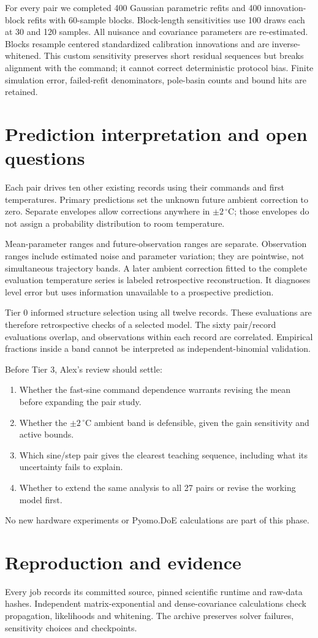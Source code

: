 \documentclass[10pt,letterpaper]{article}
\newcommand{\C}{\,^\circ\mathrm{C}}
\begin{document}
For every pair we completed 400 Gaussian parametric refits and 400 innovation-block refits with 60-sample blocks. Block-length sensitivities use 100 draws each at 30 and 120 samples. All nuisance and covariance parameters are re-estimated. Blocks resample centered standardized calibration innovations and are inverse-whitened. This custom sensitivity preserves short residual sequences but breaks alignment with the command; it cannot correct deterministic protocol bias. Finite simulation error, failed-refit denominators, pole-basin counts and bound hits are retained.

\section{Prediction interpretation and open questions}
Each pair drives ten other existing records using their commands and first temperatures. Primary predictions set the unknown future ambient correction to zero. Separate envelopes allow corrections anywhere in $\pm2\C$; those envelopes do not assign a probability distribution to room temperature.

Mean-parameter ranges and future-observation ranges are separate. Observation ranges include estimated noise and parameter variation; they are pointwise, not simultaneous trajectory bands. A later ambient correction fitted to the complete evaluation temperature series is labeled retrospective reconstruction. It diagnoses level error but uses information unavailable to a prospective prediction.

Tier 0 informed structure selection using all twelve records. These evaluations are therefore retrospective checks of a selected model. The sixty pair/record evaluations overlap, and observations within each record are correlated. Empirical fractions inside a band cannot be interpreted as independent-binomial validation.

Before Tier 3, Alex's review should settle:
\begin{enumerate}
\item Whether the fast-sine command dependence warrants revising the mean before expanding the pair study.
\item Whether the $\pm2\C$ ambient band is defensible, given the gain sensitivity and active bounds.
\item Which sine/step pair gives the clearest teaching sequence, including what its uncertainty fails to explain.
\item Whether to extend the same analysis to all 27 pairs or revise the working model first.
\end{enumerate}
No new hardware experiments or Pyomo.DoE calculations are part of this phase.

\section*{Reproduction and evidence}
Every job records its committed source, pinned scientific runtime and raw-data hashes. Independent matrix-exponential and dense-covariance calculations check propagation, likelihoods and whitening. The archive preserves solver failures, sensitivity choices and checkpoints.

\clearpage


\end{document}
